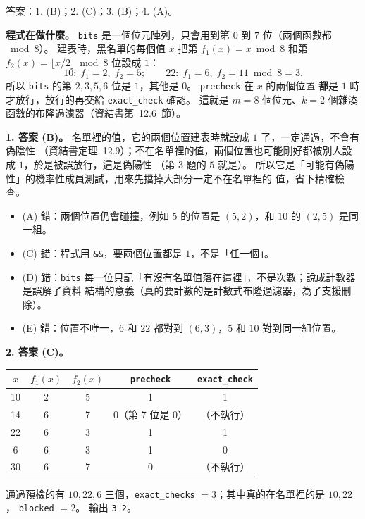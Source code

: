 \begin{pastsoln}
答案：1. (B)；2. (C)；3. (B)；4. (A)。

\textbf{程式在做什麼。} \texttt{bits} 是一個位元陣列，只會用到第 $0$ 到 $7$ 位（兩個函數都 $\bmod 8$）。
建表時，黑名單的每個值 $x$ 把第 $f_1(x) = x \bmod 8$ 和第 $f_2(x) = \lfloor x/2 \rfloor \bmod 8$ 位設成
$1$：
\[
10:\; f_1 = 2,\; f_2 = 5; \qquad 22:\; f_1 = 6,\; f_2 = 11 \bmod 8 = 3 .
\]
所以 \texttt{bits} 的第 $2, 3, 5, 6$ 位是 $1$，其他是 $0$。 \texttt{precheck} 在 $x$ 的兩個位置
\textbf{都}是 $1$ 時才放行，放行的再交給 \texttt{exact\_check} 確認。 這就是 $m = 8$ 個位元、$k = 2$
個雜湊函數的布隆過濾器（資結書第~12.6~節）。

\textbf{1. 答案 (B)。} 名單裡的值，它的兩個位置建表時就設成 $1$ 了，一定通過，不會有偽陰性
（資結書定理~12.9）；不在名單裡的值，兩個位置也可能剛好都被別人設成 $1$，於是被誤放行，這是偽陽性
（第 3 題的 $5$ 就是）。 所以它是「可能有偽陽性」的機率性成員測試，用來先擋掉大部分一定不在名單裡的
值，省下精確檢查。
\begin{itemize}
\item (A) 錯：兩個位置仍會碰撞，例如 $5$ 的位置是 $(5, 2)$，和 $10$ 的 $(2, 5)$ 是同一組。
\item (C) 錯：程式用 \texttt{\&\&}，要兩個位置都是 $1$，不是「任一個」。
\item (D) 錯：\texttt{bits} 每一位只記「有沒有名單值落在這裡」，不是次數；說成計數器是誤解了資料
結構的意義（真的要計數的是計數式布隆過濾器，為了支援刪除）。
\item (E) 錯：位置不唯一，$6$ 和 $22$ 都對到 $(6, 3)$，$5$ 和 $10$ 對到同一組位置。
\end{itemize}

\textbf{2. 答案 (C)。}
\begin{center}
\begin{tabular}{ccccc}
\toprule
$x$ & $f_1(x)$ & $f_2(x)$ & \texttt{precheck} & \texttt{exact\_check} \\
\midrule
10 & 2 & 5 & 1 & 1 \\
14 & 6 & 7 & 0（第 7 位是 0） & （不執行） \\
22 & 6 & 3 & 1 & 1 \\
6  & 6 & 3 & 1 & 0 \\
30 & 6 & 7 & 0 & （不執行） \\
\bottomrule
\end{tabular}
\end{center}
通過預檢的有 $10, 22, 6$ 三個，\texttt{exact\_checks} $= 3$；其中真的在名單裡的是 $10, 22$，
\texttt{blocked} $= 2$。 輸出 \texttt{3 2}。


\end{pastsoln}
